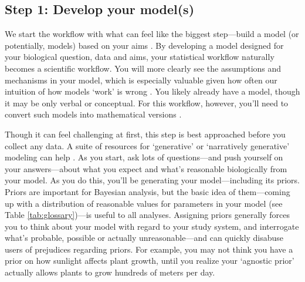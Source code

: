 \documentclass[11pt]{article}
\begin{document}
\subsection*{Step 1: Develop your model(s)} 

We start the workflow with what can feel like the biggest step---build a model (or potentially, models) based on your aims \citep{hilborn2013ecological}. By developing a model designed for your biological question, data and aims, your statistical workflow naturally becomes a scientific workflow. You will more clearly see the assumptions and mechanisms in your model, which is especially valuable given how often our intuition of how models `work' is wrong \citep{kokko2005useful}. You likely already have a model, though it may be only verbal or conceptual. For this workflow, however, you’ll need to convert such models into mathematical versions \citep{servedio2014not}. %

Though it can feel challenging at first, this step is best approached before you collect any data. A suite of resources for `generative' or `narratively generative' modeling can help \citep{statrethink,betangen}. %
As you start, ask lots of questions---and push yourself on your answers---about what you expect and what's reasonable biologically from your model. %
As you do this, you'll be generating your model---including its priors. Priors are important for Bayesian analysis, but the basic idea of them---coming up with a distribution of reasonable values for parameters in your model (see Table \ref{tab:glossary})---is useful to all analyses. Assigning priors generally forces you to think about your model with regard to your study system, and interrogate what's probable, possible or actually unreasonable---and can quickly disabuse users of prejudices regarding priors. For example, you may not think you have a prior on how sunlight affects plant growth, until you realize your `agnostic prior' actually allows plants to grow hundreds of meters per day. %
\end{document}
